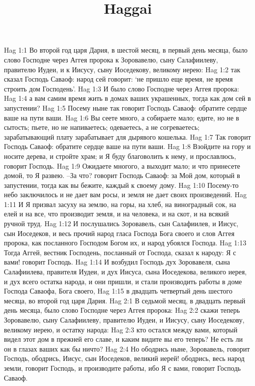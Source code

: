 

\title{Haggai}

Hag 1:1  Во второй год царя Дария, в шестой месяц, в первый день месяца, было слово Господне через Аггея пророка к Зоровавелю, сыну Салафиилеву, правителю Иудеи, и к Иисусу, сыну Иоседекову, великому иерею:
Hag 1:2  так сказал Господь Саваоф: народ сей говорит: `не пришло еще время, не время строить дом Господень'.
Hag 1:3  И было слово Господне через Аггея пророка:
Hag 1:4  а вам самим время жить в домах ваших украшенных, тогда как дом сей в запустении?
Hag 1:5  Посему ныне так говорит Господь Саваоф: обратите сердце ваше на пути ваши.
Hag 1:6  Вы сеете много, а собираете мало; едите, но не в сытость; пьете, но не напиваетесь; одеваетесь, а не согреваетесь; зарабатывающий плату зарабатывает для дырявого кошелька.
Hag 1:7  Так говорит Господь Саваоф: обратите сердце ваше на пути ваши.
Hag 1:8  Взойдите на гору и носите дерева, и стройте храм; и Я буду благоволить к нему, и прославлюсь, говорит Господь.
Hag 1:9  Ожидаете многого, а выходит мало; и что принесете домой, то Я развею. --За что? говорит Господь Саваоф: за Мой дом, который в запустении, тогда как вы бежите, каждый к своему дому.
Hag 1:10  Посему-то небо заключилось и не дает вам росы, и земля не дает своих произведений.
Hag 1:11  И Я призвал засуху на землю, на горы, на хлеб, на виноградный сок, на елей и на все, что производит земля, и на человека, и на скот, и на всякий ручной труд.
Hag 1:12  И послушались Зоровавель, сын Салафиилев, и Иисус, сын Иоседеков, и весь прочий народ гласа Господа Бога своего и слов Аггея пророка, как посланного Господом Богом их, и народ убоялся Господа.
Hag 1:13  Тогда Аггей, вестник Господень, посланный от Господа, сказал к народу: Я с вами! говорит Господь.
Hag 1:14  И возбудил Господь дух Зоровавеля, сына Салафиилева, правителя Иудеи, и дух Иисуса, сына Иоседекова, великого иерея, и дух всего остатка народа, и они пришли, и стали производить работы в доме Господа Саваофа, Бога своего,
Hag 1:15  в двадцать четвертый день шестого месяца, во второй год царя Дария.
Hag 2:1  В седьмой месяц, в двадцать первый день месяца, было слово Господне через Аггея пророка:
Hag 2:2  скажи теперь Зоровавелю, сыну Салафиилеву, правителю Иудеи, и Иисусу, сыну Иоседекову, великому иерею, и остатку народа:
Hag 2:3  кто остался между вами, который видел этот дом в прежней его славе, и каким видите вы его теперь? Не есть ли он в глазах ваших как бы ничто?
Hag 2:4  Но ободрись ныне, Зоровавель, говорит Господь, ободрись, Иисус, сын Иоседеков, великий иерей! ободрись, весь народ земли, говорит Господь, и производите работы, ибо Я с вами, говорит Господь Саваоф.
